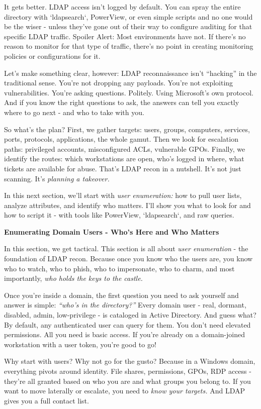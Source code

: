 It gets better. LDAP access isn’t logged by default. You can spray the entire directory with `ldapsearch`, PowerView, or even simple scripts and no one would be the wiser - unless they’ve gone out of their way to configure auditing for that specific LDAP traffic. Spoiler Alert: Most environments have not. If there’s no reason to monitor for that type of traffic, there’s no point in creating monitoring policies or configurations for it.

Let’s make something clear, however: LDAP reconnaissance isn’t “hacking” in the traditional sense. You’re not dropping any payloads. You’re not exploiting vulnerabilities. You’re asking questions. Politely. Using Microsoft’s own protocol. And if you know the right questions to ask, the answers can tell you exactly where to go next - and who to take with you.

So what’s the plan? First, we gather targets: users, groups, computers, services, ports, protocols, applications, the whole gamut. Then we look for escalation paths: privileged accounts, misconfigured ACLs, vulnerable GPOs. Finally, we identify the routes: which workstations are open, who’s logged in where, what tickets are available for abuse. That’s LDAP recon in a nutshell. It’s not just scanning. It’s \textit{planning a takeover.}

In this next section, we’ll start with \textit{user enumeration: }how to pull user lists, analyze attributes, and identify who matters. I’ll show you what to look for and how to script it - with tools like PowerView, `ldapsearch`, and raw queries.

\textbf{Enumerating Domain Users - Who’s Here and Who Matters}

In this section, we get tactical. This section is all about \textit{user enumeration} - the foundation of LDAP recon. Because once you know who the users are, you know who to watch, who to phish, who to impersonate, who to charm, and most importantly, \textit{who holds the keys to the castle.}

Once you’re inside a domain, the first question you need to ask yourself and answer is simple: \textit{“who’s in the directory?” }Every domain user - real, dormant, disabled, admin, low-privilege - is cataloged in Active Directory. And guess what? By default, any authenticated user can query for them. You don’t need elevated permissions. All you need is basic access. If you’re already on a domain-joined workstation with a user token, you’re good to go!

Why start with users? Why not go for the gusto? Because in a Windows domain, everything pivots around identity. File shares, permissions, GPOs, RDP access - they’re all granted based on who you are and what groups you belong to. If you want to move laterally or escalate, you need to \textit{know your targets. }And LDAP gives you a full contact list.

